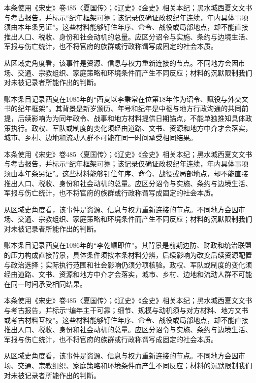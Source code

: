 本条使用《宋史》卷485〈夏国传〉；《辽史》《金史》相关本纪；黑水城西夏文文书与考古报告，并标示“纪年框架可靠；该记录仅确证政权纪年连续，年内具体事项须由本年条另证”。这些材料能够钉住年序、命令、战役或局部地点，却不能直接推出人口、税收、身份和社会动机的总量。应区分诏令与实施、条约与边境生活、军报与伤亡统计，也不将官府的族群或行政称谓写成固定的社会本质。

从区域史角度看，该事件是资源、信息与权力重新连接的节点。不同地方会因市场、交通、宗教组织、家庭策略和环境条件而产生不同反应；材料的沉默限制我们对未被记录者所能作出的判断。

账本条目记录西夏在1085年的“西夏以李秉常在位第18年作为诏令、赋役与外交文书的纪年框架”。其背景是新岁颁历、年号和纪年是中枢与地方行政沟通的共同前提，后续影响为为同年政令、战事和地方材料提供日期锚点，不能单独推知具体政策执行。政权、军队或制度的变化须经由道路、文书、资源和地方中介才会落实，城市、乡村、边地和流动人群不可能在同一时间承受相同结果。

本条使用《宋史》卷485〈夏国传〉；《辽史》《金史》相关本纪；黑水城西夏文文书与考古报告，并标示“纪年框架可靠；该记录仅确证政权纪年连续，年内具体事项须由本年条另证”。这些材料能够钉住年序、命令、战役或局部地点，却不能直接推出人口、税收、身份和社会动机的总量。应区分诏令与实施、条约与边境生活、军报与伤亡统计，也不将官府的族群或行政称谓写成固定的社会本质。

从区域史角度看，该事件是资源、信息与权力重新连接的节点。不同地方会因市场、交通、宗教组织、家庭策略和环境条件而产生不同反应；材料的沉默限制我们对未被记录者所能作出的判断。

账本条目记录西夏在1086年的“李乾顺即位”。其背景是前期边防、财政和统治联盟的压力构成直接背景，具体条件须按本条材料分辨，后续影响为改变后续资源配置与政治选择；实际执行范围和社会影响仍须分项核验。政权、军队或制度的变化须经由道路、文书、资源和地方中介才会落实，城市、乡村、边地和流动人群不可能在同一时间承受相同结果。

本条使用《宋史》卷485〈夏国传〉；《辽史》《金史》相关本纪；黑水城西夏文文书与考古报告，并标示“编年主干可靠；细节、规模与动机须与对方材料、地方文书或考古材料互校”。这些材料能够钉住年序、命令、战役或局部地点，却不能直接推出人口、税收、身份和社会动机的总量。应区分诏令与实施、条约与边境生活、军报与伤亡统计，也不将官府的族群或行政称谓写成固定的社会本质。

从区域史角度看，该事件是资源、信息与权力重新连接的节点。不同地方会因市场、交通、宗教组织、家庭策略和环境条件而产生不同反应；材料的沉默限制我们对未被记录者所能作出的判断。

